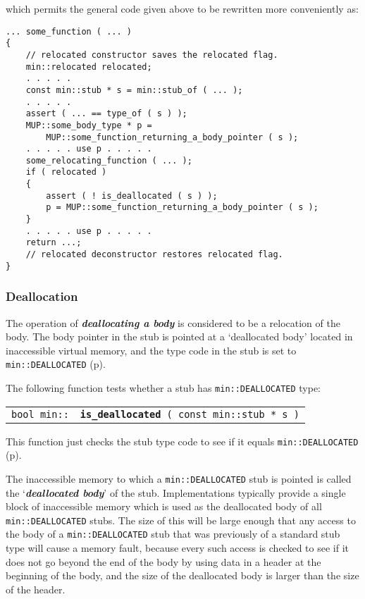 \documentclass[12pt]{article}
\makeatletter
\newcommand{\key}[1]{{\bf \em #1}\index{#1}}
\newcommand{\ikey}[2]{{\bf \em #1}\index{#2}}
\newcommand{\ttindex}[1]{\index{#1@{\tt #1}}}
\newcommand{\minindex}[1]{\ttindex{min::#1}\ttindex{#1}}
\newcommand{\pagref}[1]{p\pageref{#1}}
\newenvironment{indpar}[1][0.3in]%
	{\begin{list}{}%
		     {\setlength{\itemsep}{0in}%
		      \setlength{\topsep}{0in}%
		      \setlength{\parsep}{1ex}%
		      \setlength{\labelwidth}{#1}%
		      \setlength{\leftmargin}{#1}%
		      \addtolength{\leftmargin}{\labelsep}}%
	 \item}%
	{\end{list}}
\newcommand{\LABEL}[1]{\label{#1}}
\newcommand{\MINKEY}[1]{{\tt \bf #1}\minindex{#1}}
\makeatother
\begin{document}
which permits the general code given above to be rewritten more conveniently
as:

\begin{indpar}\begin{verbatim}
... some_function ( ... )
{
    // relocated constructor saves the relocated flag.
    min::relocated relocated;
    . . . . .
    const min::stub * s = min::stub_of ( ... );
    . . . . .
    assert ( ... == type_of ( s ) );
    MUP::some_body_type * p =
        MUP::some_function_returning_a_body_pointer ( s );
    . . . . . use p . . . . .
    some_relocating_function ( ... );
    if ( relocated )
    {
        assert ( ! is_deallocated ( s ) );
        p = MUP::some_function_returning_a_body_pointer ( s );
    }
    . . . . . use p . . . . .
    return ...;
    // relocated deconstructor restores relocated flag.
}
\end{verbatim}\end{indpar}

\subsubsection{Deallocation}
\label{DEALLOCATION}

The operation of \ikey{deallocating a body}{deallocate!body}
is considered to be a relocation of the body.  The body pointer in the
stub is pointed at a `deallocated body' located in
inaccessible virtual memory, and the type code in the stub
is set to {\tt min::DEALLOCATED} (\pagref{MIN::DEALLOCATED}).

The following function tests whether a stub
has {\tt min::DEALLOCATED} type:

\begin{indpar}\begin{tabular}{r@{}l}
\verb|bool min::| & \MINKEY{is\_deallocated}\verb| ( const min::stub * s )|
\LABEL{MIN::IS_DEALLOCATED}
\end{tabular}\end{indpar}

This function just checks the stub type code to see if it equals
{\tt min::DEALLOCATED} (\pagref{MIN::DEALLOCATED}).

The inaccessible memory to which a {\tt min::DEALLOCATED} stub is
pointed is called the `\key{deallocated body}' of the stub.
Implementations typically provide a single block of inaccessible memory
which is used as the deallocated body of all {\tt min::DEALLOCATED} stubs.
The size of this will be large enough that any access to the body of
a {\tt min::DEALLOCATED} stub that was previously of a
standard stub type will cause a memory fault, because every such access is
checked to see if it does not go beyond the end of the body by using
data in a header at the beginning of the body,
and the size of the deallocated body is larger than the size of the header.
\end{document}

